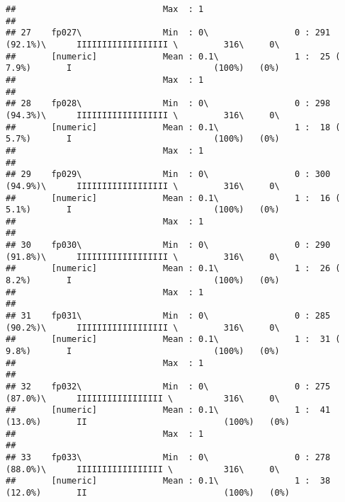 \documentclass[]{article}
\begin{document}
\begin{verbatim}
##                             Max  : 1                                                                                       
## 
## 27    fp027\                Min  : 0\                 0 : 291 (92.1%)\      IIIIIIIIIIIIIIIIII \         316\     0\       
##       [numeric]             Mean : 0.1\               1 :  25 ( 7.9%)       I                            (100%)   (0%)     
##                             Max  : 1                                                                                       
## 
## 28    fp028\                Min  : 0\                 0 : 298 (94.3%)\      IIIIIIIIIIIIIIIIII \         316\     0\       
##       [numeric]             Mean : 0.1\               1 :  18 ( 5.7%)       I                            (100%)   (0%)     
##                             Max  : 1                                                                                       
## 
## 29    fp029\                Min  : 0\                 0 : 300 (94.9%)\      IIIIIIIIIIIIIIIIII \         316\     0\       
##       [numeric]             Mean : 0.1\               1 :  16 ( 5.1%)       I                            (100%)   (0%)     
##                             Max  : 1                                                                                       
## 
## 30    fp030\                Min  : 0\                 0 : 290 (91.8%)\      IIIIIIIIIIIIIIIIII \         316\     0\       
##       [numeric]             Mean : 0.1\               1 :  26 ( 8.2%)       I                            (100%)   (0%)     
##                             Max  : 1                                                                                       
## 
## 31    fp031\                Min  : 0\                 0 : 285 (90.2%)\      IIIIIIIIIIIIIIIIII \         316\     0\       
##       [numeric]             Mean : 0.1\               1 :  31 ( 9.8%)       I                            (100%)   (0%)     
##                             Max  : 1                                                                                       
## 
## 32    fp032\                Min  : 0\                 0 : 275 (87.0%)\      IIIIIIIIIIIIIIIII \          316\     0\       
##       [numeric]             Mean : 0.1\               1 :  41 (13.0%)       II                           (100%)   (0%)     
##                             Max  : 1                                                                                       
## 
## 33    fp033\                Min  : 0\                 0 : 278 (88.0%)\      IIIIIIIIIIIIIIIII \          316\     0\       
##       [numeric]             Mean : 0.1\               1 :  38 (12.0%)       II                           (100%)   (0%)     

\end{verbatim}
\end{document}

